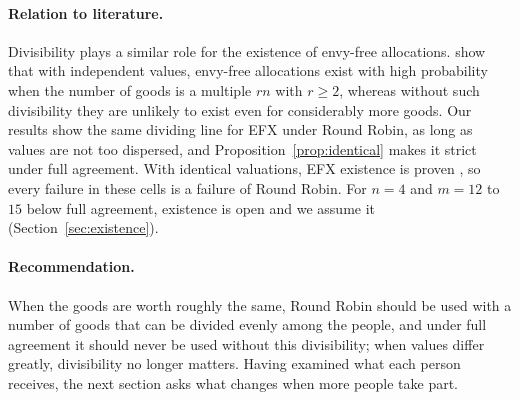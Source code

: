 \paragraph{Relation to literature.}
Divisibility plays a similar role for the existence of envy-free allocations.
\textcite{manurangsi2019} show that with independent values, envy-free allocations exist with
high probability when the number of goods is a multiple $rn$ with $r\geq2$, whereas without such
divisibility they are unlikely to exist even for considerably more goods. Our results show the
same dividing line for EFX under Round Robin, as long as values are not too dispersed, and
Proposition~\ref{prop:identical} makes it strict under full agreement. With identical valuations,
EFX existence is proven \parencite{plaut2020}, so every failure in these cells is a failure of
Round Robin. For $n=4$ and $m=12$ to $15$ below full agreement, existence is open and we assume it
(Section~\ref{sec:existence}).

\paragraph{Recommendation.}
When the goods are worth roughly the same, Round Robin should be used with a number of goods that
can be divided evenly among the people, and under full agreement it should never be used without
this divisibility; when values differ greatly, divisibility no longer matters. Having examined
what each person receives, the next section asks what changes when more people take part.
